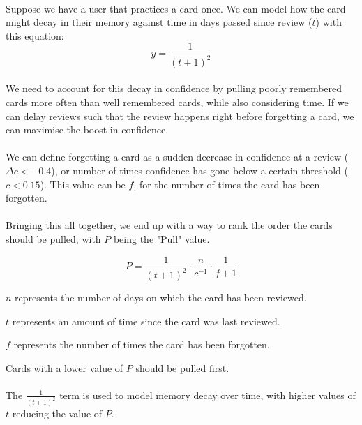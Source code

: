 \documentclass{report}
\begin{document}
\paragraph{}
Suppose we have a user that practices a card once. We can model how the card might decay in their memory against time in days passed since review ($t$) with this equation:
\[
  y = \frac{1}{(t + 1) ^ {2}}
\]

\paragraph{}
We need to account for this decay in confidence by pulling poorly remembered cards more often than well remembered cards, while also considering time. If we can delay reviews such that the review happens right before forgetting a card, we can maximise the boost in confidence.

\paragraph{}
We can define forgetting a card as a sudden decrease in confidence at a review ($\Delta c < -0.4$), or number of times confidence  has gone below a certain threshold ($c < 0.15$). This value can be $f$, for the number of times the card has been forgotten.

\paragraph{}
Bringing this all together, we end up with a way to rank the order the cards should be pulled, with $P$ being the "Pull" value.

\[
  P = \frac{1}{(t + 1) ^ 2} \cdot \frac{n}{c ^ {-1}} \cdot \frac{1}{f + 1}
\]

$n$ represents the number of days on which the card has been reviewed.

$t$ represents an amount of time since the card was last reviewed.

$f$ represents the number of times the card has been forgotten.

Cards with a lower value of $P$ should be pulled first.

\paragraph{}
The $\frac{1}{(t + 1) ^{2}}$ term is used to model memory decay over time, with higher values of $t$ reducing the value of $P$.
\end{document}
